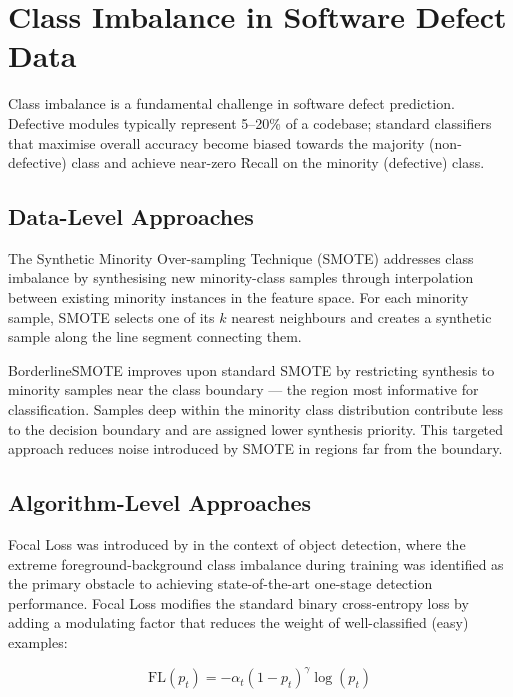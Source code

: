 \documentclass[12pt,a4paper,oneside]{report}
\begin{document}
\section{Class Imbalance in Software Defect Data}

Class imbalance is a fundamental challenge in software defect prediction. Defective modules typically represent 5--20\% of a codebase; standard classifiers that maximise overall accuracy become biased towards the majority (non-defective) class and achieve near-zero Recall on the minority (defective) class.

\subsection{Data-Level Approaches}

The Synthetic Minority Over-sampling Technique (SMOTE) \citep{chawla2002} addresses class imbalance by synthesising new minority-class samples through interpolation between existing minority instances in the feature space. For each minority sample, SMOTE selects one of its $k$ nearest neighbours and creates a synthetic sample along the line segment connecting them.

BorderlineSMOTE \citep{han2005} improves upon standard SMOTE by restricting synthesis to minority samples near the class boundary --- the region most informative for classification. Samples deep within the minority class distribution contribute less to the decision boundary and are assigned lower synthesis priority. This targeted approach reduces noise introduced by SMOTE in regions far from the boundary.

\subsection{Algorithm-Level Approaches}

Focal Loss was introduced by \citet{lin2017} in the context of object detection, where the extreme foreground-background class imbalance during training was identified as the primary obstacle to achieving state-of-the-art one-stage detection performance. Focal Loss modifies the standard binary cross-entropy loss by adding a modulating factor that reduces the weight of well-classified (easy) examples:

\begin{equation}
  \text{FL}(p_t) = -\alpha_t (1 - p_t)^{\gamma} \log(p_t)
  \label{eq:focal_loss}
\end{equation}
\end{document}
